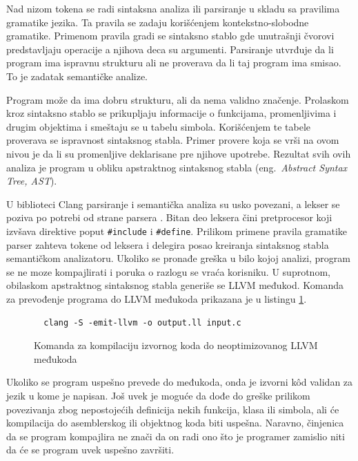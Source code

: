 \documentclass[12pt,oneside]{memoir}
\begin{document}
Nad nizom tokena se radi sintaksna analiza ili parsiranje u skladu sa pravilima gramatike jezika.
Ta pravila se zadaju korišćenjem kontekstno-slobodne gramatike.
Primenom pravila gradi se sintaksno stablo gde unutrašnji čvorovi predstavljaju operacije a njihova deca su argumenti.
Parsiranje utvrđuje da li program ima ispravnu strukturu ali ne proverava da li taj program ima smisao.
To je zadatak semantičke analize.

Program može da ima dobru strukturu, ali da nema validno značenje.
Prolaskom kroz sintaksno stablo se prikupljaju informacije o funkcijama, promenljivima i drugim objektima i smeštaju se u tabelu simbola.
Korišćenjem te tabele proverava se ispravnost sintaksnog stabla.
Primer provere koja se vrši na ovom nivou je da li su promenljive deklarisane pre njihove upotrebe.
Rezultat svih ovih analiza je program u obliku apstraktnog sintaksnog stabla (eng.~{\em Abstract Syntax Tree, AST}).

U biblioteci Clang parsiranje i semantička analiza su usko povezani, a lekser se poziva po potrebi od strane parsera \cite{stulova2019overview}.
Bitan deo leksera čini pretprocesor koji izvšava direktive poput \verb|#include| i \verb|#define|.
Prilikom primene pravila gramatike parser zahteva tokene od leksera i delegira posao kreiranja sintaksnog stabla semantičkom analizatoru.
Ukoliko se pronađe greška u bilo kojoj analizi, program se ne moze kompajlirati i poruka o razlogu se vraća korisniku.
U suprotnom, obilaskom apstraktnog sintaksnog stabla generiše se LLVM međukod.
Komanda za prevođenje programa do LLVM međukoda prikazana je u listingu \ref{lst:clang_command}.

\begin{figure}[!ht]
\begin{verbatim}
  clang -S -emit-llvm -o output.ll input.c
\end{verbatim}
\caption{Komanda za kompilaciju izvornog koda do neoptimizovanog LLVM međukoda}
\label{lst:clang_command}
\end{figure}

Ukoliko se program uspešno prevede do međukoda, onda je izvorni k\^od validan za jezik u kome je napisan.
Još uvek je moguće da dođe do greške prilikom povezivanja zbog nepostojećih definicija nekih funkcija, klasa ili simbola, ali će kompilacija do asemblerskog ili objektnog koda biti uspešna.
Naravno, činjenica da se program kompajlira ne znači da on radi ono što je programer zamislio niti da će se program uvek uspešno završiti.
\end{document}
